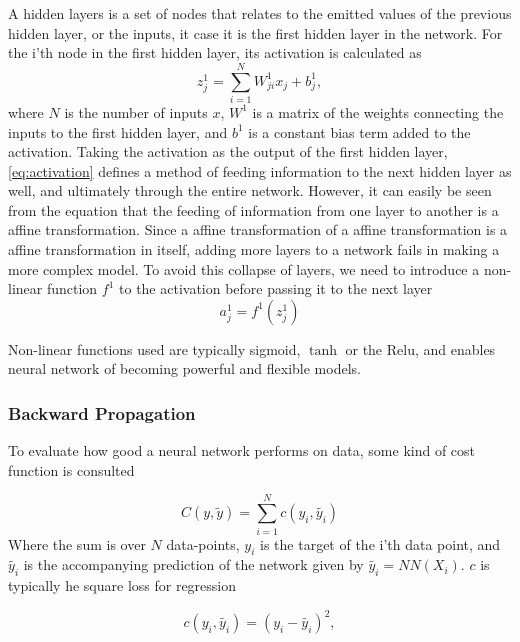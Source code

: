 A hidden layers is a set of nodes that relates to the emitted values of the 
previous hidden layer, or the inputs, it case it is the first hidden layer in the 
network. For the i'th node in the first hidden layer, its activation is 
calculated as
\begin{equation}\label{eq:activation}
    z^1_j = \sum_{i=1}^N W^1_{ji}x_j + b^1_j,
\end{equation}
where $N$ is the number of inputs $x$, $W^1$ is a matrix of the weights connecting the inputs to the first hidden layer, and $b^1$ is a constant bias term added to the activation. Taking the activation as the output of the first hidden layer, \autoref{eq:activation} defines a method of feeding information to the next hidden layer as well, and ultimately through the entire network. However, it can easily be seen from the equation that the feeding of information from one layer to another is a affine transformation. Since a affine transformation of a affine transformation is a affine transformation in itself, adding more layers to a network fails in making a more complex model. To avoid this collapse of 
layers, we need to introduce a non-linear function $f^1$ to the activation before 
passing it to the next layer
\begin{equation}\label{eq:non_linear}
    a^1_j = f^1(z^1_j)
\end{equation}

Non-linear functions used are typically sigmoid, $\tanh$ or the Relu, and enables neural network of becoming powerful and flexible models.

\subsubsection{Backward Propagation}
To evaluate how good a neural network performs on data, some kind of 
cost function is consulted

\begin{equation}\label{eq:cost}
    C(y, \tilde{y}) = \sum_{i=1}^N c(y_i, \tilde{y_i}) 
\end{equation}
Where the sum is over $N$ data-points, $y_i$ is the target of the i'th data point,
and $\tilde{y_i}$ is the accompanying prediction of the network given by $\tilde{y_i} = NN(X_i)$. $c$ is typically he square loss for regression

\begin{equation}\label{eq:square_loss}
    c(y_i, \tilde{y_i}) = (y_i - \tilde{y_i})^2,
\end{equation}

